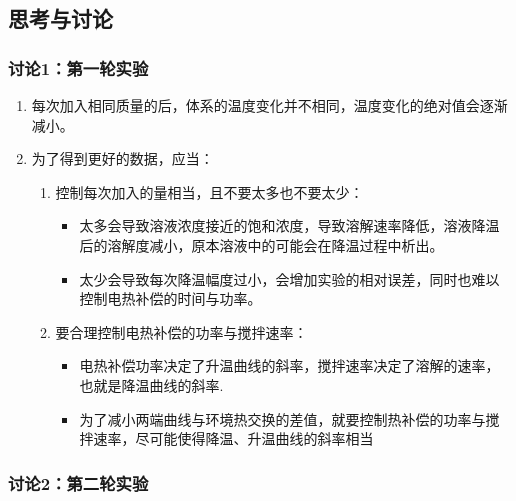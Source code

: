 \documentclass[cn,hazy,pku,12pt,normal,math=newtx,cite=super]{elegantnote}
\begin{document}
\subsection{思考与讨论}

\subsubsection{讨论1：第一轮实验}

\begin{enumerate}
    \item 每次加入相同质量的后，体系的温度变化并不相同，温度变化的绝对值会逐渐减小。
    \item 为了得到更好的数据，应当：
    \begin{enumerate}
        \item 控制每次加入的量相当，且不要太多也不要太少：
        \begin{itemize}
            \item 太多会导致溶液浓度接近的饱和浓度，导致溶解速率降低，溶液降温后的溶解度减小，原本溶液中的可能会在降温过程中析出。
            \item 太少会导致每次降温幅度过小，会增加实验的相对误差，同时也难以控制电热补偿的时间与功率。
        \end{itemize}
        \item 要合理控制电热补偿的功率与搅拌速率：
        \begin{itemize}
            \item 电热补偿功率决定了升温曲线的斜率，搅拌速率决定了溶解的速率，也就是降温曲线的斜率.
            \item 为了减小两端曲线与环境热交换的差值，就要控制热补偿的功率与搅拌速率，尽可能使得降温、升温曲线的斜率相当
        \end{itemize}
    \end{enumerate}
\end{enumerate}

\subsubsection{讨论2：第二轮实验}
\end{document}
